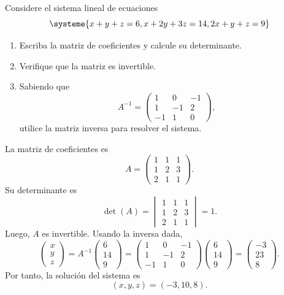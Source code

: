 \documentclass[11pt,respuestas,a4]{aleph-examen}
\begin{document}
\begin{preguntas}
\item
Considere el sistema lineal de ecuaciones
\[
\systeme{
x+y+z=6,
x+2y+3z=14,
2x+y+z=9
}
\]

\begin{enumerate}
    \item Escriba la matriz de coeficientes y calcule su determinante.
    \item Verifique que la matriz es invertible.
    \item Sabiendo que
    \[
        A^{-1}=
        \begin{pmatrix}
            1 & 0 & -1 \\
            1 & -1 & 2 \\
            -1 & 1 & 0
        \end{pmatrix},
    \]
    utilice la matriz inversa para resolver el sistema.
\end{enumerate}

\begin{respuesta}
La matriz de coeficientes es
\[
    A=\begin{pmatrix}
        1 & 1 & 1 \\
        1 & 2 & 3 \\
        2 & 1 & 1
    \end{pmatrix}.
\]
Su determinante es
\[
    \det(A)=
    \begin{vmatrix}
        1 & 1 & 1 \\
        1 & 2 & 3 \\
        2 & 1 & 1
    \end{vmatrix}
    =1.
\]
Luego, \(A\) es invertible. Usando la inversa dada,
\[
    \begin{pmatrix}x\\y\\z\end{pmatrix}
    =A^{-1}\begin{pmatrix}6\\14\\9\end{pmatrix}
    =
    \begin{pmatrix}
        1 & 0 & -1 \\
        1 & -1 & 2 \\
        -1 & 1 & 0
    \end{pmatrix}
    \begin{pmatrix}6\\14\\9\end{pmatrix}
    =
    \begin{pmatrix}-3\\23\\8\end{pmatrix}.
\]
Por tanto, la solución del sistema es
\[
    (x,y,z)=(-3,10,8).
\]
\end{respuesta}


\end{preguntas}
\end{document}
